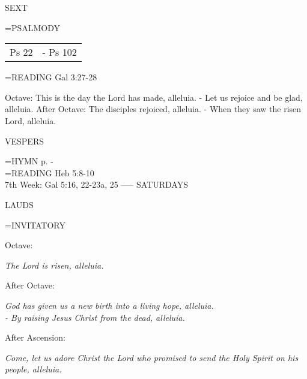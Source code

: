 \begin{flushleft}\normalsize SEXT\\\end{flushleft}
\hangindent=\parindent \small{PSALMODY}
\begin{center}
\begin{tabular}{ l l }
Ps 22 &  - Ps 102\\
\end{tabular}
\end{center}		

\hangindent=\parindent \small{\uppercase{READING}}    Gal 3:27-28 \textbf{   \\}

Octave:	This is the day the Lord has made, alleluia.
		- Let us rejoice and be glad, alleluia.
After Octave:	The disciples rejoiced, alleluia.
		- When they saw the risen Lord, alleluia.

\begin{flushleft}\normalsize VESPERS\\\end{flushleft}
\hangindent=\parindent \small{\uppercase{HYMN} p. \pageref{easter:firstHymn}-\pageref{easter:lastHymn}\\}
\hangindent=\parindent \small{\uppercase{READING}}    Heb 5:8-10 \textbf{   \\}
7th Week:	Gal 5:16, 22-23a, 25    
-----
SATURDAYS

\begin{flushleft}\normalsize LAUDS\\\end{flushleft}
\hangindent=\parindent \small{INVITATORY}
\begin{center}
\end{center}Octave:\begin{center}\textit{	The Lord is risen, alleluia.\\}
\end{center}After Octave:\begin{center}\textit{	God has given us a new birth into a living hope, alleluia.\\}
\textit{		- By raising Jesus Christ from the dead, alleluia.\\}
\end{center}After Ascension:\begin{center}\textit{	Come, let us adore Christ the Lord who promised to send the Holy Spirit on his people, alleluia.\\}
\end{center}

